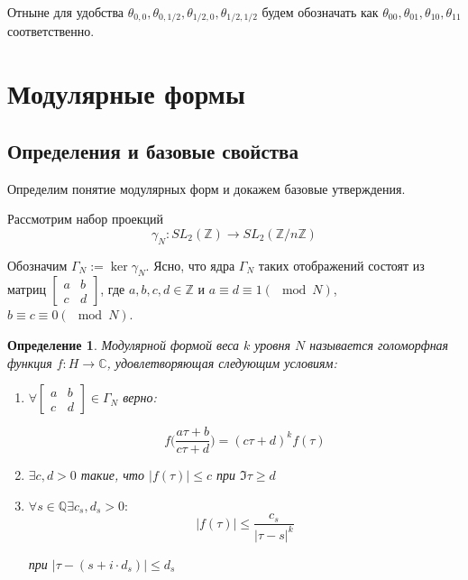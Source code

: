 \documentclass{article}
\newcommand{\ZZ}{\mathbb{Z}}
\newcommand{\CC}{\mathbb{C}}
\newcommand{\QQ}{\mathbb{Q}}
\theoremstyle{break}
\newtheorem{definition}[theorem]{Определение}
\begin{document}
Отныне для удобства $\theta_{0, 0}, \theta_{0, 1/2}, \theta_{1/2, 0}, \theta_{1/2, 1/2}$
будем обозначать как $\theta_{00}, \theta_{01}, \theta_{10}, \theta_{11}$ соответственно.


\section{Модулярные формы}

\subsection{Определения и базовые свойства}
Определим понятие модулярных форм и докажем базовые утверждения.

Рассмотрим набор проекций
\begin{equation}
		\gamma_N: SL_2(\ZZ) \to SL_2 (\ZZ / n \ZZ)
\end{equation}


Обозначим $\Gamma_N := \ker \gamma_N$. Ясно, что ядра $\Gamma_N$ таких отображений состоят из матриц $\begin{bmatrix} a & b \\ c & d \end{bmatrix}$, где $a, b, c, d \in \ZZ$ и $a \equiv d \equiv 1(\mod N)$, $b \equiv c \equiv 0(\mod N)$.


\begin{definition}
	Модулярной формой веса $k$ уровня $N$ называется голоморфная функция $f: H \to \CC$, удовлетворяющая следующим условиям:
	
	\begin{enumerate}[start=1, label={(\bfseries M\arabic*):}]
		\item $\forall \begin{bmatrix}
			a & b \\ c & d
		\end{bmatrix} \in \Gamma_N$ верно:

	\begin{equation}
			f \Big( \frac{a\tau + b}{c\tau + d} \Big) = (c\tau + d)^k f(\tau)
	\end{equation}

	
	
		\item $\exists c, d >0$ такие, что $|f(\tau)| \le c$
				при $\Im \tau \ge d$
	
		\item $\forall s \in \QQ \exists c_s, d_s > 0:$
		\begin{equation}
			|f(\tau)| \le \frac{c_s}{|\tau - s|^k}
		\end{equation}
			
		при $|\tau - (s + i \cdot d_s)| \le d_s$
	\end{enumerate}
\end{definition}
\end{document}
